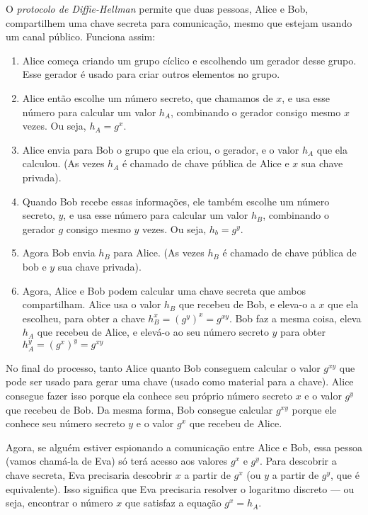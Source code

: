 O {\em protocolo de Diffie-Hellman} permite que duas pessoas, Alice e Bob, compartilhem uma chave secreta para comunicação, mesmo que estejam usando um canal público.
Funciona assim:
\begin{enumerate}
\item  Alice começa criando um grupo cíclico e escolhendo um gerador desse grupo.
  Esse gerador é usado para criar outros elementos no grupo.
\item Alice então escolhe um número secreto, que chamamos de $x$, e usa esse número para calcular um valor $h_A$, combinando o gerador consigo mesmo $x$ vezes.
  Ou seja, $h_A = g^x$.
\item Alice envia para Bob o grupo que ela criou, o gerador, e o valor $h_A$ que ela calculou.
(As vezes $h_A$ é chamado de chave pública de Alice e $x$ sua chave privada).
\item Quando Bob recebe essas informações, ele também escolhe um número secreto, $y$, e usa esse número para calcular um valor $h_B$, combinando o gerador $g$ consigo mesmo $y$ vezes.
  Ou seja, $h_b = g^y$.
\item Agora Bob envia $h_B$ para Alice.
  (As vezes $h_B$ é chamado de chave pública de bob e $y$ sua chave privada).
\item Agora, Alice e Bob podem calcular uma chave secreta que ambos compartilham.
  Alice usa o valor $h_B$ que recebeu de Bob, e eleva-o a $x$ que ela escolheu, para obter a chave $h_B^x = (g^y)^x = g^{xy}$.
  Bob faz a mesma coisa, eleva $h_A$ que recebeu de Alice, e elevá-o ao seu número secreto $y$ para obter $h_A^y = (g^x)^y = g^{xy}$
\end{enumerate}

No final do processo, tanto Alice quanto Bob conseguem calcular o valor $g^{xy}$ que pode ser usado para gerar uma chave (usado como material para a chave).
Alice consegue fazer isso porque ela conhece seu próprio número secreto $x$ e o valor $g^y$ que recebeu de Bob.
Da mesma forma, Bob consegue calcular $g^{xy}$ porque ele conhece seu número secreto $y$ e o valor $g^x$ que recebeu de Alice.

Agora, se alguém estiver espionando a comunicação entre Alice e Bob, essa pessoa (vamos chamá-la de Eva) só terá acesso aos valores $g^x$ e $g^y$.
Para descobrir a chave secreta, Eva precisaria descobrir $x$ a partir de $g^x$ (ou $y$ a partir de $g^y$, que é equivalente).
Isso significa que Eva precisaria resolver o logaritmo discreto — ou seja, encontrar o número $x$ que satisfaz a equação $g^x = h_A$.

